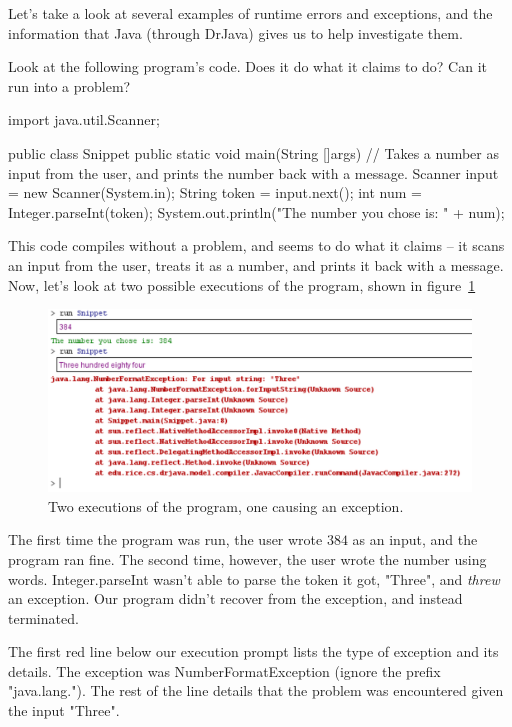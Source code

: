 Let's take a look at several examples of runtime errors and exceptions, and the information that Java (through DrJava) gives us to help investigate them.

\begin{example}
Look at the following program's code. Does it do what it claims to do? Can it run into a problem?

\begin{code}
import java.util.Scanner;

public class Snippet{
    public static void main(String []args){
      // Takes a number as input from the user, and prints the number back with a message.
      Scanner input = new Scanner(System.in);
      String token = input.next();
      int num = Integer.parseInt(token);
      System.out.println("The number you chose is: " + num);
    }
}
\end{code}
\end{example}

This code compiles without a problem, and seems to do what it claims -- it scans an input from the user, treats it as a number, and prints it back with a message. Now, let's look at two possible executions of the program, shown in figure~\ref{fig:number_format_error}

\begin{figure}[h!]
\centering
\includegraphics[scale=0.7]{lectures/images/number_format_exception.PNG}
\caption{Two executions of the program, one causing an exception.}
\label{fig:number_format_error}
\end{figure}

The first time the program was run, the user wrote $384$ as an input, and the program ran fine. The second time, however, the user wrote the number using words. Integer.parseInt wasn't able to parse the token it got, "Three", and \emph{threw} an exception. Our program didn't recover from the exception, and instead terminated.

The first red line below our execution prompt lists the type of exception and its details. The exception was NumberFormatException (ignore the prefix "java.lang."). The rest of the line details that the problem was encountered given the input "Three".


